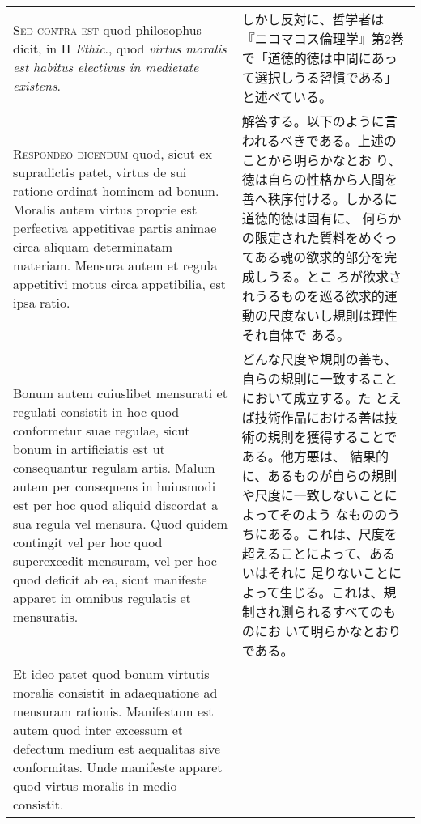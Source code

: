 \documentclass[10pt]{jsarticle}
\begin{document}
\begin{longtable}{p{21em}p{21em}}
\\




{\scshape Sed contra est} quod philosophus dicit, in II {\itshape
Ethic}., quod {\itshape virtus moralis est habitus electivus in
medietate existens}.


&

 しかし反対に、哲学者は『ニコマコス倫理学』第2巻で「道徳的徳は中間にあっ
 て選択しうる習慣である」と述べている。
 

\\




 {\scshape Respondeo dicendum} quod, sicut ex supradictis patet,
 virtus de sui ratione ordinat hominem ad bonum. Moralis autem virtus
 proprie est perfectiva appetitivae partis animae circa aliquam
 determinatam materiam. Mensura autem et regula appetitivi motus circa
 appetibilia, est ipsa ratio.

&

 解答する。以下のように言われるべきである。上述のことから明らかなとお
 り、徳は自らの性格から人間を善へ秩序付ける。しかるに道徳的徳は固有に、
 何らかの限定された質料をめぐってある魂の欲求的部分を完成しうる。とこ
 ろが欲求されうるものを巡る欲求的運動の尺度ないし規則は理性それ自体で
 ある。

\\


 Bonum autem cuiuslibet mensurati et regulati consistit in hoc quod
 conformetur suae regulae, sicut bonum in artificiatis est ut
 consequantur regulam artis. Malum autem per consequens in huiusmodi
 est per hoc quod aliquid discordat a sua regula vel mensura. Quod
 quidem contingit vel per hoc quod superexcedit mensuram, vel per hoc
 quod deficit ab ea, sicut manifeste apparet in omnibus regulatis et
 mensuratis.

 &

 どんな尺度や規則の善も、自らの規則に一致することにおいて成立する。た
 とえば技術作品における善は技術の規則を獲得することである。他方悪は、
 結果的に、あるものが自らの規則や尺度に一致しないことによってそのよう
 なもののうちにある。これは、尺度を超えることによって、あるいはそれに
 足りないことによって生じる。これは、規制され測られるすべてのものにお
 いて明らかなとおりである。

\\


 Et ideo patet quod bonum virtutis moralis consistit in adaequatione
 ad mensuram rationis. Manifestum est autem quod inter excessum et
 defectum medium est aequalitas sive conformitas. Unde manifeste
 apparet quod virtus moralis in medio consistit.


\end{longtable}
\end{document}
